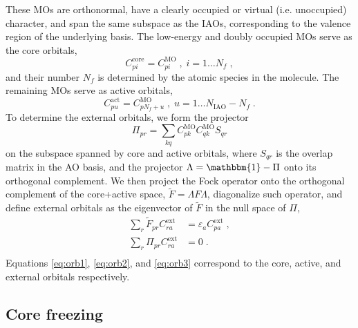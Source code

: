 \documentclass[aps,pra,twocolumn]{revtex4-2}
\begin{document}
These MOs are orthonormal, have a clearly occupied or virtual (i.e. unoccupied) character, and span the same subspace as the IAOs, 
corresponding to the valence region of the underlying basis.
The low-energy and doubly occupied MOs serve as the core orbitals,
\begin{equation}
\label{eq:orb1}
C^{\mathrm{core}}_{pi} = C^{\mathrm{MO}}_{pi} \;,\; i=1 \dots N_f \;,
\end{equation}
and their number $N_f$ is determined by the atomic species in the molecule. The remaining MOs serve as active orbitals,
\begin{equation}
\label{eq:orb2}
C^{\mathrm{act}}_{pu} = C^{\mathrm{MO}}_{p N_f+u} \;,\; u= 1 \dots N_{\mathrm{IAO}}-N_f \;.
\end{equation}
To determine the external orbitals, we form the projector 
\begin{equation}
\Pi_{pr} = \sum_{kq} C^{\mathrm{MO}}_{pk} C^{\mathrm{MO}}_{qk} S_{qr}
\end{equation}
on the subspace spanned by core and active orbitals, where $S_{qr}$ is the overlap matrix in the AO basis,
and the projector $\Lambda = \mathbbm{1}-\Pi$ onto its orthogonal complement.
We then project the Fock operator onto the orthogonal complement of the core+active space,
$\tilde{F} = \Lambda F \Lambda$, diagonalize such operator, and define external orbitals
as the eigenvector of $\tilde{F}$ in the null space of $\Pi$,
\begin{equation}
\label{eq:orb3}
\begin{split}
\sum_r \tilde{F}_{pr} C^{\mathrm{ext}}_{ra} &= \varepsilon_a C^{\mathrm{ext}}_{pa} \; , \\
\sum_r \Pi_{pr} C^{\mathrm{ext}}_{ra} &= 0 \; . \\
\end{split}
\end{equation}
Equations \eqref{eq:orb1}, \eqref{eq:orb2}, and \eqref{eq:orb3} correspond to the core, active, and external orbitals respectively.

\subsection{Core freezing}
\label{app:core}
\end{document}
